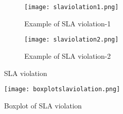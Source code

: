 \begin{figure}
     \centering
     \begin{subfigure}[b]{0.45\textwidth}
         \texttt{[image: slaviolation1.png]}
         \caption{Example of SLA violation-1}
         \label{figure:slaviolation1}
     \end{subfigure}
     \hfill
     \begin{subfigure}[b]{0.45\textwidth}
         \texttt{[image: slaviolation2.png]}
         \caption{Example of SLA violation-2}
         \label{figure:slaviolation2}
     \end{subfigure}
     \caption{SLA violation}
     \label{fig:slaviolationgraphs}
\end{figure}

\begin{figure}[h]
  \begin{center}
    \texttt{[image: boxplotslaviolation.png]}
    \caption{Boxplot of SLA violation}
    \label{figure:boxplotslaviolation}
  \end{center}
\end{figure}
